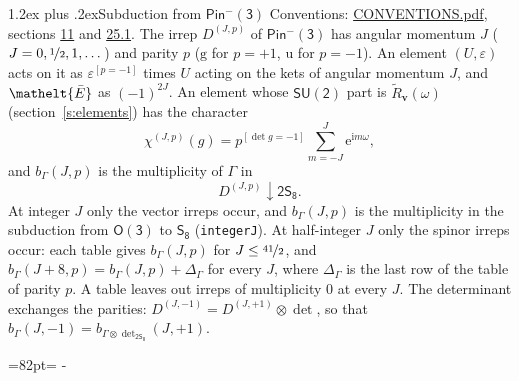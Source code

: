\documentclass[10pt,a4paper]{article}
\makeatletter
\renewcommand\section{\@startsection{section}{1}{\z@}{-3ex plus -1ex minus -.2ex}%
  {1.2ex plus .2ex}{\normalfont\large\sffamily\bfseries\color{parttitle}}}
\newcommand{\needspace}[1]{\par\penalty-100\begingroup\dimen0=#1\relax\dimen2=\pagegoal
  \advance\dimen2-\pagetotal\ifdim\dimen0>\dimen2\relax\ifdim\dimen2>0pt\vfil\break\fi\fi
  \endgroup}
\numberwithin{equation}{section}
\newcommand{\eltfont}[1]{{\let\sigma\eltsigma\mathelt{#1}}}
\newcommand{\grp}[1]{\mathsf{#1}}
\newcommand{\elt}[1]{\eltfont{#1}}
\newcommand{\ptag}[1]{\mathrm{#1}}
\newcommand{\iverson}[1]{[#1]}
\newcommand{\restr}[2]{#1\!\downarrow#2}
\newcommand{\vv}{\mathbf{v}}
\newcommand{\iunit}{\mathrm{i}}
\newcommand{\expe}{\mathrm{e}}
\newcommand{\irrJp}[2]{D^{(#1,#2)}}
\newcommand{\irrprod}{\otimes}
\newcommand{\barred}[1]{\bar{#1}}
\newcommand{\lift}[1]{\tilde{#1}}
\makeatother
\begin{document}
\section{Subduction from \texorpdfstring{$\grp{Pin^{-}(3)}$}{Pin(3)}}\label{s:subduction_parent}
Conventions: \href{../../CONVENTIONS.pdf}{CONVENTIONS.pdf}, sections \href{../../../rotation/CONVENTIONS.pdf\#conv.11}{11} and \href{../../CONVENTIONS.pdf\#conv.25.1}{25.1}.
\leavevmode\label{n:index.J}\label{n:index.parity}\label{n:irrep.o3}The irrep $\irrJp{J}{p}$ of \href{Pinminus3.pdf}{$\grp{Pin^{-}(3)}$} has angular momentum $J$ ($J = 0, \nicefrac{1}{2}, 1, \dots$) and parity $p$ ($\ptag{g}$ for $p = +1$, $\ptag{u}$ for $p = -1$). An element $(U, \varepsilon)$ acts on it as $\varepsilon^{[p = -1]}$ times $U$ acting on the kets of angular momentum $J$, and $\elt{\barred{E}}$ as $(-1)^{2J}$. \label{n:function.character.parent}\label{n:function.multiplicity}An element whose $\grp{SU(2)}$ part is $\lift{R}_{\vv}(\omega)$ (section~\ref{s:elements}) has the character
\begin{equation}\label{e:chi}\chi^{(J,p)}(g) = p^{\iverson{\det g = -1}}\sum_{m=-J}^{J} \expe^{\iunit m\omega},\end{equation}
and $b_\Gamma(J, p)$ is the multiplicity of $\Gamma$ in
\begin{equation}\label{e:parent}\restr{\irrJp{J}{p}}{\grp{2S_{8}}}.\end{equation}
At integer $J$ only the vector irreps occur, and $b_\Gamma(J, p)$ is the multiplicity in the subduction from $\grp{O(3)}$ to \href{../../../rotation/data/pdf/S8.pdf}{$\grp{S_{8}}$} (\texttt{integerJ}). \label{n:index.increment}At half-integer $J$ only the spinor irreps occur: each table gives $b_\Gamma(J, p)$ for $J \le \nicefrac{41}{2}$, and $b_\Gamma(J + 8, p) = b_\Gamma(J, p) + \Delta_\Gamma$ for every $J$, where $\Delta_\Gamma$ is the last row of the table of parity $p$. A table leaves out irreps of multiplicity 0 at every $J$.
\leavevmode\label{n:operator.determinant.character}The determinant exchanges the parities: $\irrJp{J}{-1} = \irrJp{J}{+1} \irrprod \det$, so that $b_\Gamma(J, -1) = b_{\Gamma \irrprod \det_{\grp{2S_{8}}}}(J, +1)$.
\needspace{82pt}
\end{document}
